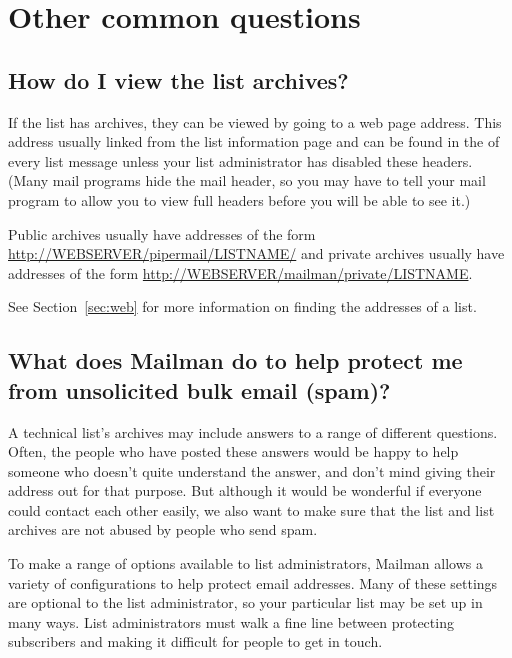 \documentclass{howto}
\begin{document}
\section{Other common questions}

\subsection{How do I view the list archives?}
If the list has archives, they can be viewed by going to a web page address.
This address usually linked from the list information page and can be found in 
the  of every list message unless your list 
administrator has disabled these headers.  (Many mail programs hide the 
 mail header, so you may have to tell your 
mail program to allow you to view full headers before you will be able to 
see it.)

Public archives usually have addresses of the form 
\url{http://WEBSERVER/pipermail/LISTNAME/} and private archives usually
have addresses of the form \url{http://WEBSERVER/mailman/private/LISTNAME}.

See Section~\ref{sec:web} for more information on finding the addresses of a
list.

\subsection{What does Mailman do to help protect me from unsolicited bulk email
(spam)?\label{sec:antispam}}

A technical list's archives may include answers to a range of
different questions.  Often, the people who have posted these answers would
be happy to help someone who doesn't quite understand the answer, and don't
mind giving their address out for that purpose.  But
although it would be wonderful if everyone could contact each other easily,
we also want to make sure that the list and list archives are not abused by 
people who send spam.  

To make a range of options available to list administrators, Mailman allows
a variety of configurations to help protect email addresses.  
Many of these settings are optional to the list administrator, so your
particular list may be set up in many ways.  List administrators 
must walk a fine line between protecting subscribers and making it difficult
for people to get in touch.  
\end{document}
